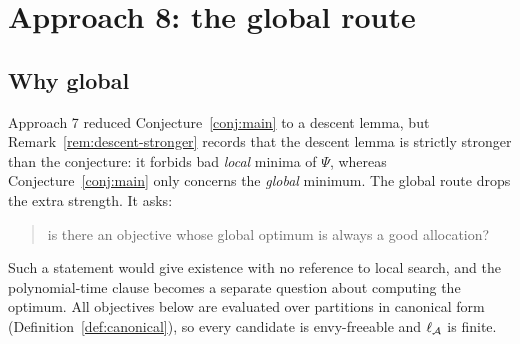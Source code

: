 
\section{Approach 8: the global route}
\label{sec:approach8}

\subsection{Why global}

Approach 7 reduced Conjecture~\ref{conj:main} to a descent lemma, but
Remark~\ref{rem:descent-stronger} records that the descent lemma is strictly
stronger than the conjecture: it forbids bad \emph{local} minima of $\Psi$,
whereas Conjecture~\ref{conj:main} only concerns the \emph{global} minimum. The
global route drops the extra strength. It asks:

\begin{quote}
  is there an objective whose global optimum is always a good allocation?
\end{quote}

Such a statement would give existence with no reference to local search, and the
polynomial-time clause becomes a separate question about computing the optimum.
All objectives below are evaluated over partitions in canonical form
(Definition~\ref{def:canonical}), so every candidate is envy-freeable and
$\ell_{\mathcal{A}}$ is finite.

